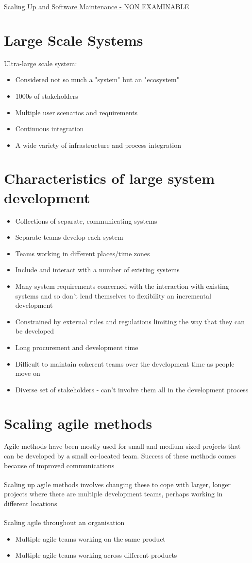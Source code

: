 \documentclass{article}[18pt]
\begin{document}
\begin{center}
\underline{\huge Scaling Up and Software Maintenance - NON EXAMINABLE}
\end{center}
\section{Large Scale Systems}
Ultra-large scale system:
\begin{itemize}
	\item Considered not so much a "system" but an "ecosystem"
	\item 1000s of stakeholders
	\item Multiple user scenarios and requirements
	\item Continuous integration
	\item A wide variety of infrastructure and process integration
\end{itemize}
\section{Characteristics of large system development}
\begin{itemize}
	\item Collections of separate, communicating systems
	\item Separate teams develop each system
	\item Teams working in different places/time zones
	\item Include and interact with a number of existing systems
	\item Many system requirements concerned with the interaction with existing systems and so don't lend themselves to flexibility an incremental development
	\item Constrained by external rules and regulations limiting the way that they can be developed
	\item Long procurement and development time
	\item Difficult to maintain coherent teams over the development time as people move on
	\item Diverse set of stakeholders - can't involve them all in the development process
\end{itemize}
\section{Scaling agile methods}
Agile methods have been mostly used for small and medium sized projects that can be developed by a small co-located team. Success of these methods comes because of improved communications\\
\\
Scaling up agile methods involves changing these to cope with larger, longer projects where there are multiple development teams, perhaps working in different locations\\
\\
Scaling agile throughout an organisation
\begin{itemize}
	\item Multiple agile teams working on the same product
	\item Multiple agile teams working across different products
\end{itemize}
\end{document}
